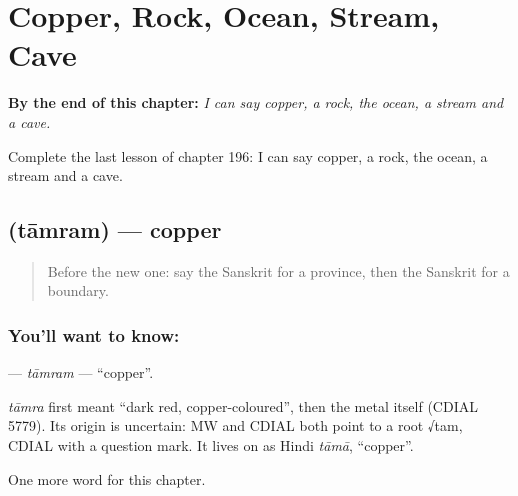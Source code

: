 
\chapter{Copper, Rock, Ocean, Stream, Cave}
\label{ch:sa-copper-rock-ocean-stream-cave}

\begin{chapteropening}
\textbf{By the end of this chapter:} \emph{I can say copper, a rock, the ocean, a stream and a cave.}

Complete the last lesson of chapter 196: I can say copper, a rock, the ocean, a stream and a cave.
\end{chapteropening}

\section[\texorpdfstring{\sk{ताम्रम्} (tāmram)}{ताम्रम् (tāmram)}]{ (tāmram) — copper}

\label{lesson:SA-C196-tamram}



\begin{quote}
Before the new one: say the Sanskrit for a province, then the Sanskrit for a boundary.
\end{quote}

\subsection*{You'll want to know: }
\textbf{} — \emph{tāmram} — \textquotedblleft{}copper\textquotedblright{}.

\begin{cousinweb}
\emph{tāmra} first meant \textquotedblleft{}dark red, copper-coloured\textquotedblright{}, then the metal itself (CDIAL 5779). Its origin is uncertain: MW and CDIAL both point to a root √tam, CDIAL with a question mark. It lives on as Hindi \emph{tāmā}, \textquotedblleft{}copper\textquotedblright{}.
\end{cousinweb}

\begin{grammarlens}[title={What you've built}]
One more word for this chapter.
\end{grammarlens}

